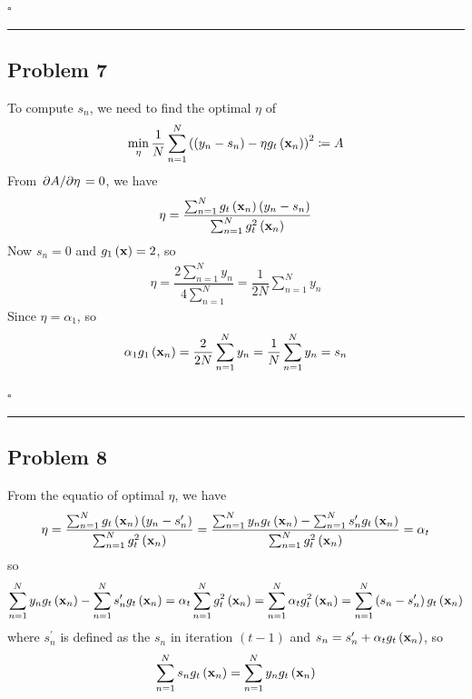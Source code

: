 \documentclass[12pt]{article}
\newcommand*{\QEDB}{\hfill\ensuremath{\square}}
\newcommand{\ParTh}[1]{\left(#1\right)}
\newcommand{\BF}[1]{{\bf#1}}
\newcommand{\Divide}[2]{\left.#1\middle/#2\right.}
\newcommand{\horrule}[1]{\rule{\linewidth}{#1}}
\begin{document}
\QEDB

\horrule{0.5pt}

\subsection*{Problem 7}

To compute $s_n$, we need to find the optimal $\eta$ of
\begin{align}
\min_\eta\dfrac{1}{N}\sum_{n=1}^{N}\ParTh{\ParTh{y_n-s_n}-\eta g_t\ParTh{\BF{x}_n}}^2\coloneqq A
\end{align}
From $\Divide{\partial A}{\partial\eta}=0$, we have
\begin{align}
\eta=\dfrac{\sum_{n=1}^{N}g_t\ParTh{\BF{x}_n}\ParTh{y_n-s_n}}{\sum_{n=1}^{N}g^2_t\ParTh{\BF{x}_n}}
\end{align}
Now $s_n=0$ and $g_1\ParTh{\BF{x}}=2$, so
\begin{align}
\eta=\dfrac{2\sum_{n=1}^{N}y_n}{4\sum_{n=1}^{N}}=\dfrac{1}{2N}\sum_{n=1}^{N}y_n
\end{align}
Since $\eta=\alpha_1$, so
\begin{align}
\alpha_1g_1\ParTh{\BF{x}_n}=\dfrac{2}{2N}\sum_{n=1}^{N}y_n=\dfrac{1}{N}\sum_{n=1}^{N}y_n=s_n
\end{align}

\QEDB

\horrule{0.5pt}

\subsection*{Problem 8}

From the equatio of optimal $\eta$, we have
\begin{align}
\eta=\dfrac{\sum_{n=1}^{N}g_t\ParTh{\BF{x}_n}\ParTh{y_n-s^\prime_n}}{\sum_{n=1}^{N}g^2_t\ParTh{\BF{x}_n}}=\dfrac{\sum_{n=1}^{N}y_ng_t\ParTh{\BF{x}_n}-\sum_{n=1}^{N}s^\prime_ng_t\ParTh{\BF{x}_n}}{\sum_{n=1}^{N}g^2_t\ParTh{\BF{x}_n}}=\alpha_t
\end{align}
so
\begin{align}
\sum_{n=1}^{N}y_ng_t\ParTh{\BF{x}_n}-\sum_{n=1}^{N}s^\prime_ng_t\ParTh{\BF{x}_n}=\alpha_t\sum_{n=1}^{N}g^2_t\ParTh{\BF{x}_n}=\sum_{n=1}^{N}\alpha_tg^2_t\ParTh{\BF{x}_n}=\sum_{n=1}^{N}\ParTh{s_n-s^\prime_n}g_t\ParTh{\BF{x}_n}
\end{align}
where $s^\prime_n$ is defined as the $s_n$ in iteration $\ParTh{t-1}$ and $s_n=s^\prime_n+\alpha_tg_t\ParTh{\BF{x}_n}$, so
\begin{align}
\sum_{n=1}^{N}s_ng_t\ParTh{\BF{x}_n}=\sum_{n=1}^{N}y_ng_t\ParTh{\BF{x}_n}
\end{align}
\end{document}
